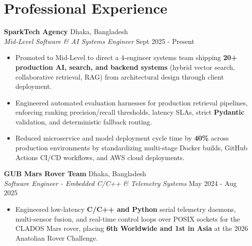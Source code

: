 \documentclass[9.5pt,a4paper]{article}
\begin{document}
\section*{Professional Experience}
\noindent
\textbf{SparkTech Agency} \hfill Dhaka, Bangladesh\\
\textit{Mid-Level Software & AI Systems Engineer} \hfill Sept 2025 - Present
\begin{itemize}
    \item Promoted to Mid-Level to direct a 4-engineer systems team shipping \textbf{20+ production AI, search, and backend systems} (hybrid vector search, collaborative retrieval, RAG) from architectural design through client deployment.
    \item Engineered automated evaluation harnesses for production retrieval pipelines, enforcing ranking precision/recall thresholds, latency SLAs, strict \textbf{Pydantic} validation, and deterministic fallback routing.
    \item Reduced microservice and model deployment cycle time by \textbf{40\%} across production environments by standardizing multi-stage Docker builds, GitHub Actions CI/CD workflows, and AWS cloud deployments.
\end{itemize}
\vspace{0.6pt}
\noindent
\textbf{GUB Mars Rover Team} \hfill Dhaka, Bangladesh\\
\textit{Software Engineer - Embedded C/C++ & Telemetry Systems} \hfill May 2024 - Aug 2025
\begin{itemize}
    \item Engineered low-latency \textbf{C/C++ and Python} serial telemetry daemons, multi-sensor fusion, and real-time control loops over POSIX sockets for the CLADOS Mars rover, placing \textbf{6th Worldwide and 1st in Asia} at the 2026 Anatolian Rover Challenge.
\end{itemize}
\vspace{0.6pt}
\end{document}
